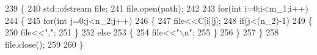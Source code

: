 \begin{DoxyCode}
239                                         \{
240                                                 std::ofstream file;
241                                                 file.open(path);
242 
243                                                 \textcolor{keywordflow}{for}(\textcolor{keywordtype}{int} i=0;i<m\_1;i++)
244                                                 \{
245                                                         \textcolor{keywordflow}{for}(\textcolor{keywordtype}{int} j=0;j<n\_2;j++)
246                                                         \{
247                                                                 file<<C[i][j];
248                                                                 \textcolor{keywordflow}{if}(j<(n\_2)-1)
249                                                                 \{
250                                                                         file<<\textcolor{stringliteral}{","};
251                                                                 \}
252                                                                 \textcolor{keywordflow}{else}
253                                                                 \{
254                                                                         file<<\textcolor{stringliteral}{"\(\backslash\)n"};
255                                                                 \}
256                                                         \}
257                                                 \}
258                                                 file.close();
259 
260                                         \}
\end{DoxyCode}
